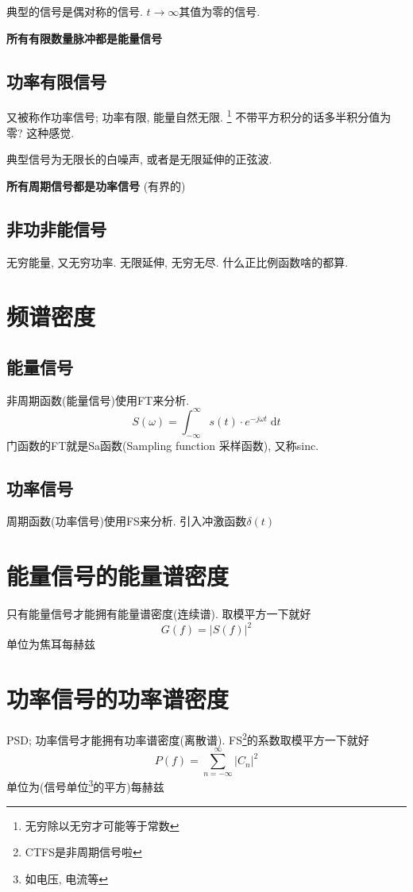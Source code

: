 \documentclass[a4paper]{report}
\begin{document}
典型的信号是偶对称的信号. $t\rightarrow \infty$其值为零的信号. 

\textbf{所有有限数量脉冲都是能量信号}
\subsection{功率有限信号}
又被称作功率信号; 功率有限, 能量自然无限. \footnote{无穷除以无穷才可能等于常数} 
不带平方积分的话多半积分值为零? 这种感觉. 

典型信号为无限长的白噪声, 或者是无限延伸的正弦波. 

\textbf{所有周期信号都是功率信号} (有界的)
\subsection{非功非能信号}
无穷能量, 又无穷功率. 无限延伸, 无穷无尽. 什么正比例函数啥的都算. 
\section{频谱密度}
\subsection{能量信号}
非周期函数(能量信号)使用FT来分析. 
\begin{equation}
  S(\omega)=\int_{-\infty}^{\infty}s(t)\cdot e^{-j\omega t}\; \text{d}t
\end{equation}
门函数的FT就是Sa函数(Sampling function 采样函数), 又称sinc. 
\subsection{功率信号}
周期函数(功率信号)使用FS来分析. 引入冲激函数$\delta(t)$
\section{能量信号的能量谱密度}
只有能量信号才能拥有能量谱密度(连续谱). 取模平方一下就好
\begin{equation}
  G(f)=\lvert S(f)\rvert^2
\end{equation}
单位为焦耳每赫兹
\section{功率信号的功率谱密度}
PSD; 功率信号才能拥有功率谱密度(离散谱). FS\footnote{CTFS是非周期信号啦}的系数取模平方一下就好
\begin{equation}
  P(f)=\displaystyle\sum_{n=-\infty}^{\infty}\lvert C_n\rvert^2
\end{equation}
单位为(信号单位\footnote{如电压, 电流等}的平方)每赫兹
\end{document}
